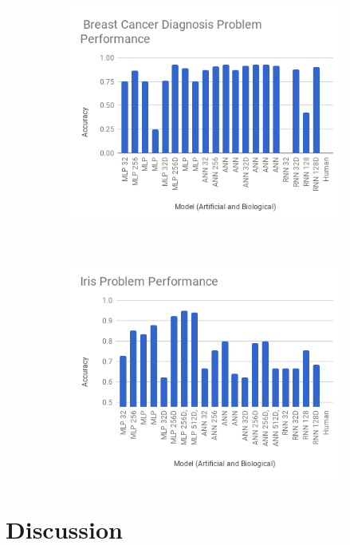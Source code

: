 \documentclass[]{report}
\begin{document}
\begin{figure}[H]
\begin{subfigure}[b]{0.45\textwidth}
		\includegraphics[width=\textwidth]{chart4.png}
	\end{subfigure}
~
	\begin{subfigure}[b]{0.45\textwidth}
		\includegraphics[width=\textwidth]{chart5.png}
	\end{subfigure}
\end{figure}


\section{Discussion}
\end{document}

